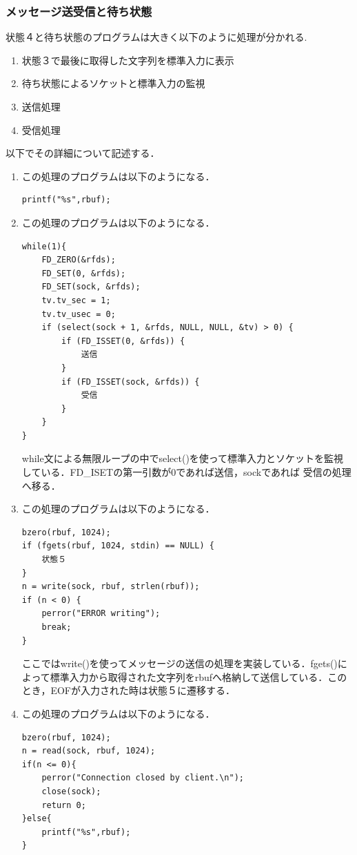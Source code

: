 \documentclass[dvipdfmx]{jarticle}
\begin{document}
\subsubsection{メッセージ送受信と待ち状態}
状態４と待ち状態のプログラムは大きく以下のように処理が分かれる.
\begin{enumerate}
    \item 状態３で最後に取得した文字列を標準入力に表示
    \item 待ち状態によるソケットと標準入力の監視
    \item 送信処理
    \item 受信処理
\end{enumerate}
以下でその詳細について記述する．
\begin{enumerate}
    \item この処理のプログラムは以下のようになる．
    \begin{lstlisting}
printf("%s",rbuf);
    \end{lstlisting}
    \item この処理のプログラムは以下のようになる．
    \begin{lstlisting}
while(1){
    FD_ZERO(&rfds);
    FD_SET(0, &rfds);
    FD_SET(sock, &rfds);
    tv.tv_sec = 1;
    tv.tv_usec = 0;
    if (select(sock + 1, &rfds, NULL, NULL, &tv) > 0) {
        if (FD_ISSET(0, &rfds)) {
            送信      
        }
        if (FD_ISSET(sock, &rfds)) {
            受信
        }
    }
} 
    \end{lstlisting}
    while文による無限ループの中でselect()を使って標準入力とソケットを監視している．FD\_ISETの第一引数が0であれば送信，sockであれば
    受信の処理へ移る．
    \item この処理のプログラムは以下のようになる．
    \begin{lstlisting}
bzero(rbuf, 1024);
if (fgets(rbuf, 1024, stdin) == NULL) {
    状態５
}
n = write(sock, rbuf, strlen(rbuf));
if (n < 0) {
    perror("ERROR writing");
    break;
}
    \end{lstlisting}
    ここではwrite()を使ってメッセージの送信の処理を実装している．fgets()によって標準入力から取得された文字列をrbufへ格納して送信している．このとき，EOFが入力された時は状態５に遷移する．
    \item この処理のプログラムは以下のようになる．
    \begin{lstlisting}
bzero(rbuf, 1024);
n = read(sock, rbuf, 1024);
if(n <= 0){
    perror("Connection closed by client.\n");
    close(sock);
    return 0;
}else{
    printf("%s",rbuf);
}
    \end{lstlisting}
\end{enumerate}
\end{document}
